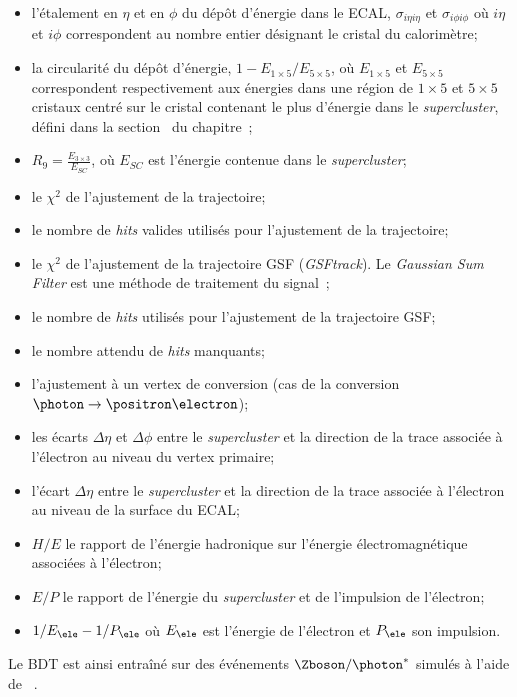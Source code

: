 \begin{itemize}
\item l'étalement en $\eta$ et en $\phi$ du dépôt d'énergie dans le ECAL, $\sigma_{i\eta i\eta}$ et $\sigma_{i\phi i\phi}$ où $i\eta$ et $i\phi$ correspondent au nombre entier désignant le cristal du calorimètre;
\item la circularité du dépôt d'énergie, $1- E_{1\times5}/E_{5\times5}$, où $ E_{1\times5}$ et $E_{5\times5}$ correspondent respectivement aux énergies dans une région de $1\times5$ et $5\times5$ cristaux centré sur le cristal contenant le plus d'énergie dans le \emph{supercluster}, défini dans la section~ du chapitre~;
\item $R_9 = \frac{E_{3\times3}}{E_{SC}}$, où $E_{SC}$ est l'énergie contenue dans le \emph{supercluster};
\item le $\chi^2$ de l'ajustement de la trajectoire;
\item le nombre de \emph{hits} valides utilisés pour l'ajustement de la trajectoire;
\item le $\chi^2$ de l'ajustement de la trajectoire GSF (\emph{GSFtrack}). Le \emph{Gaussian Sum Filter} est une méthode de traitement du signal~\cite{GSF};
\item le nombre de \emph{hits} utilisés pour l'ajustement de la trajectoire GSF;
\item le nombre attendu de \emph{hits} manquants;
\item l'ajustement à un vertex de conversion (cas de la conversion $\photon\to\positron\electron$);
\item les écarts $\Delta\eta$ et $\Delta\phi$ entre le \emph{supercluster} et la direction de la trace associée à l'électron au niveau du vertex primaire;
\item l'écart $\Delta\eta$ entre le \emph{supercluster} et la direction de la trace associée à l'électron au niveau de la surface du ECAL;
\item $H/E$ le rapport de l'énergie hadronique sur l'énergie électromagnétique associées à l'électron;
\item $E/P$ le rapport de l'énergie du \emph{supercluster} et de l'impulsion de l'électron;
\item $1/E_{\ele}-1/P_{\ele}$ où $E_{\ele}$ est l'énergie de l'électron et $P_{\ele}$ son impulsion.
\end{itemize}
Le BDT est ainsi entraîné sur des événements $\Zboson/\photon^*$ simulés à l'aide de \MADGRAPH~\cite{madgraph5}.


